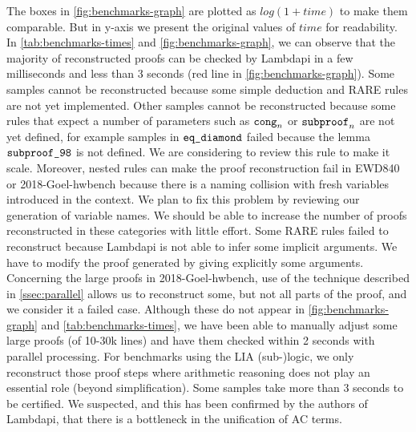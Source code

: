 The boxes in \cref{fig:benchmarks-graph} are plotted as $log(1 + time)$  to make them comparable. But in y-axis we present the original values of $time$ for readability.
In \cref{tab:benchmarks-times} and \cref{fig:benchmarks-graph}, we can observe that the majority of reconstructed proofs can be checked by Lambdapi in a few milliseconds and less than 3 seconds (red line in \cref{fig:benchmarks-graph}).
Some samples cannot be reconstructed because some simple deduction and RARE rules are not yet implemented. 
Other samples cannot be reconstructed because some rules that expect a number of parameters such as $\texttt{\upshape{cong}}_n$ or $\texttt{\upshape{subproof}}_n$  are not yet defined, for example
samples in $\texttt{\upshape{eq\_diamond}}$ failed because the lemma $\texttt{\upshape{subproof\_98}}$ is not defined. We are considering to review this rule to make it scale.
Moreover, nested  rules can make the proof reconstruction fail in EWD840 or 2018-Goel-hwbench because there is a naming collision with fresh variables introduced in the context. We plan to fix this problem by reviewing our generation of variable names.
We should be able to increase the number of proofs reconstructed in these categories with little effort.
Some RARE rules failed to reconstruct because Lambdapi is not able to infer some implicit arguments. We have to modify the proof generated by giving explicitly some arguments.
Concerning the large proofs in 2018-Goel-hwbench, use of the technique described in \cref{ssec:parallel} allows us to reconstruct some, but not all parts of the proof, and we consider it a failed case.
Although these do not appear in \cref{fig:benchmarks-graph} and \cref{tab:benchmarks-times}, we have been able to manually adjust some large proofs (of 10-30k lines) and have them checked within 2 seconds with parallel processing.
For benchmarks using the LIA (sub-)logic, we only reconstruct those proof steps where arithmetic reasoning does not play an essential role (beyond simplification).
Some samples take more than 3 seconds to be certified. We suspected, and this has been confirmed by the authors of Lambdapi, that there is a bottleneck in the unification of AC terms.

